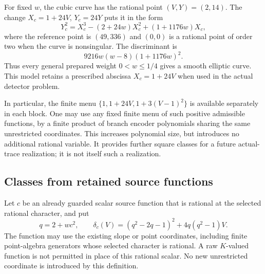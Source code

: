 \documentclass[11pt,a4paper]{article}
\begin{document}
For fixed \(w\), the cubic curve has the rational point
\((V,Y)=(2,14)\). The change \(X_c=1+24V\), \(Y_c=24Y\)
puts it in the form
\[
 Y_c^2=X_c^3-(2+24w)X_c^2+(1+1176w)X_c,
\]
where the reference point is \((49,336)\) and \((0,0)\) is a
rational point of order two when the curve is nonsingular.
The discriminant is
\[
                    9216w(w-8)(1+1176w)^2.
\]
Thus every general prepared weight \(0<w\le1/4\) gives a smooth
elliptic curve. This model retains a prescribed abscissa
\(X_c=1+24V\) when used in the actual detector problem.

In particular, the finite menu
\(\{1,1+24V,1+3(V-1)^2\}\) is available separately in each block.
One may use any fixed finite menu of such positive admissible
functions, by a finite product of branch encoder polynomials sharing
the same unrestricted coordinates. This increases polynomial size,
but introduces no additional rational variable. It provides further
square classes for a future actual-trace realization; it is not itself
such a realization.

\subsection{Classes from retained source functions}

Let $c$ be an already guarded scalar source function that is rational
at the selected rational character, and put
\begin{equation}\label{eq:adaptiveclass}
 q=2+wc^2,\qquad
 \delta_c(V)=(q^2-2q-1)^2+4q(q^2-1)V.
\end{equation}
The function may use the existing slope or point coordinates, including
finite point-algebra generators whose selected character is rational.
A raw $K$-valued function is not permitted in place of this rational
scalar. No new unrestricted coordinate is introduced by this definition.
\end{document}
